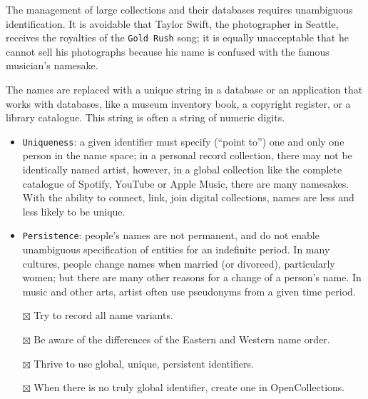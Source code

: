 \documentclass[
  letterpaper,
  DIV=11,
  numbers=noendperiod]{scrreprt}
\providecommand{\tightlist}{%
  \setlength{\itemsep}{0pt}\setlength{\parskip}{0pt}}\usepackage{longtable,booktabs,array}
\begin{document}
The management of large collections and their databases requires
unambiguous identification. It is avoidable that Taylor Swift, the
photographer in Seattle, receives the royalties of the
\texttt{Gold\ Rush} song; it is equally unacceptable that he cannot sell
his photographs because his name is confused with the famous musician's
namesake.

The names are replaced with a unique string in a database or an
application that works with databases, like a museum inventory book, a
copyright register, or a library catalogue. This string is often a
string of numeric digits.

\begin{itemize}
\item
  \texttt{Uniqueness}: a given identifier must specify (``point to'')
  one and only one person in the name space; in a personal record
  collection, there may not be identically named artist, however, in a
  global collection like the complete catalogue of Spotify, YouTube or
  Apple Music, there are many namesakes. With the ability to connect,
  link, join digital collections, names are less and less likely to be
  unique.
\item
  \texttt{Persistence}: people's names are not permanent, and do not
  enable unambiguous specification of entities for an indefinite period.
  In many cultures, people change names when married (or divorced),
  particularly women; but there are many other reasons for a change of a
  person's name. In music and other arts, artist often use pseudonyms
  from a given time period.
\end{itemize}

\begin{tcolorbox}[enhanced jigsaw, opacityback=0, bottomrule=.15mm, rightrule=.15mm, toptitle=1mm, breakable, colbacktitle=quarto-callout-tip-color!10!white, colback=white, title=\textcolor{quarto-callout-tip-color}{\faLightbulb}\hspace{0.5em}{Tips for people's names}, leftrule=.75mm, toprule=.15mm, left=2mm, arc=.35mm, colframe=quarto-callout-tip-color-frame, coltitle=black, titlerule=0mm, bottomtitle=1mm, opacitybacktitle=0.6]

\begin{itemize}
\tightlist
\item[$\boxtimes$]
  Try to record all name variants.
\item[$\boxtimes$]
  Be aware of the differences of the Eastern and Western name order.
\item[$\boxtimes$]
  Thrive to use global, unique, persistent identifiers.
\item[$\boxtimes$]
  When there is no truly global identifier, create one in
  OpenCollections.
\end{itemize}

\end{tcolorbox}
\end{document}
